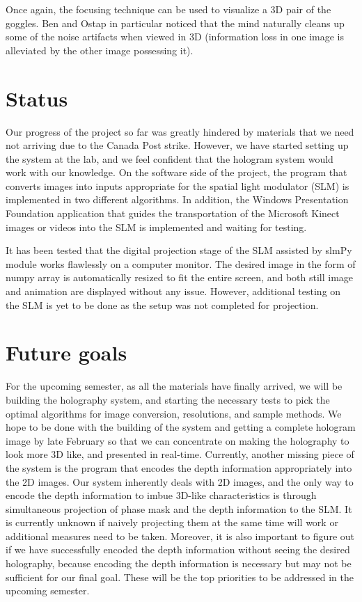 \documentclass[12pt]{article}
\begin{document}
Once again, the focusing technique can be used to visualize a 3D pair of the goggles. Ben and Ostap in particular noticed that the mind naturally cleans up some of the noise artifacts when viewed in 3D (information loss in one image is alleviated by the other image possessing it).

\section{Status}
Our progress of the project so far was greatly hindered by materials that we need not arriving due to the Canada Post strike. However, we have started setting up the system at the lab, and we feel confident that the hologram system would work with our knowledge. On the software side of the project, the program that converts images into inputs appropriate for the spatial light modulator (SLM) is implemented in two different algorithms. In addition, the Windows Presentation Foundation application that guides the transportation of the Microsoft Kinect images or videos into the SLM is implemented and waiting for testing.

It has been tested that the digital projection stage of the SLM assisted by slmPy module works flawlessly on a computer monitor. The desired image in the form of numpy array is automatically resized to fit the entire screen, and both still image and animation are displayed without any issue. However, additional testing on the SLM is yet to be done as the setup was not completed for projection.

\section{Future goals}
For the upcoming semester, as all the materials have finally arrived, we will be building the holography system, and starting the necessary tests to pick the optimal algorithms for image conversion, resolutions, and sample methods. We hope to be done with the building of the system and getting a complete hologram image by late February so that we can concentrate on making the holography to look more 3D like, and presented in real-time. Currently, another missing piece of the system is the program that encodes the depth information appropriately into the 2D images. Our system inherently deals with 2D images, and the only way to encode the depth information to imbue 3D-like characteristics is through simultaneous projection of phase mask and the depth information to the SLM. It is currently unknown if naively projecting them at the same time will work or additional measures need to be taken. Moreover, it is also important to figure out if we have successfully encoded the depth information without seeing the desired holography, because encoding the depth information is necessary but may not be sufficient for our final goal. These will be the top priorities to be addressed in the upcoming semester.
\end{document}
